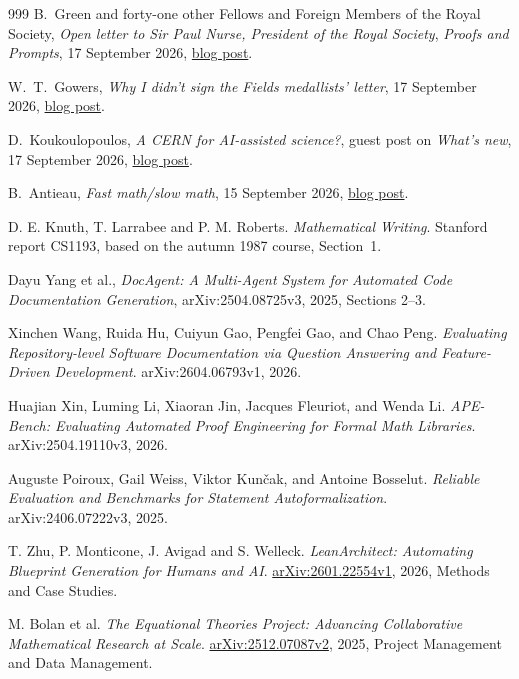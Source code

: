 \documentclass[10pt]{article}
\begin{document}
\begin{thebibliography}{999}
 B.~Green and forty-one other Fellows and Foreign Members
of the Royal Society,
\emph{Open letter to Sir Paul Nurse, President of the Royal Society},
\emph{Proofs and Prompts}, 17 September 2026,
\href{https://proofsandprompts.com/2026/09/17/open-letter-to-sir-paul-nurse-president-of-the-royal-society/}{blog post}.

 W.~T.~Gowers, \emph{Why I didn't sign the Fields medallists'
letter}, 17 September 2026,
\href{https://gowers.wordpress.com/2026/09/17/why-i-didnt-sign-the-fields-medallists-letter/}{blog post}.

 D.~Koukoulopoulos, \emph{A CERN for AI-assisted
science?}, guest post on \emph{What's new}, 17 September 2026,
\href{https://terrytao.wordpress.com/2026/09/17/a-cern-for-ai-assisted-science/}{blog post}.

 B.~Antieau, \emph{Fast math/slow math}, 15 September 2026,
\href{https://antieau.github.io/2026/09/15/fast-math-slow-math.html}{blog post}.

 D. E. Knuth, T. Larrabee and P. M. Roberts. \emph{Mathematical Writing}. Stanford report CS1193, based on the autumn 1987 course, Section~1.

Dayu Yang et al., \emph{DocAgent: A Multi-Agent System for Automated Code Documentation Generation}, arXiv:2504.08725v3, 2025, Sections 2--3.

Xinchen Wang, Ruida Hu, Cuiyun Gao, Pengfei Gao, and Chao Peng. \emph{Evaluating Repository-level Software Documentation via Question Answering and Feature-Driven Development}. arXiv:2604.06793v1, 2026.

Huajian Xin, Luming Li, Xiaoran Jin, Jacques Fleuriot, and Wenda Li. \emph{APE-Bench: Evaluating Automated Proof Engineering for Formal Math Libraries}. arXiv:2504.19110v3, 2026.

Auguste Poiroux, Gail Weiss, Viktor Kun\v{c}ak, and Antoine Bosselut. \emph{Reliable Evaluation and Benchmarks for Statement Autoformalization}. arXiv:2406.07222v3, 2025.

 T. Zhu, P. Monticone, J. Avigad and S. Welleck.
\emph{LeanArchitect: Automating Blueprint Generation for Humans and AI}.
\href{https://arxiv.org/abs/2601.22554v1}{arXiv:2601.22554v1}, 2026, Methods and Case Studies.

 M. Bolan et al. \emph{The Equational Theories Project: Advancing Collaborative Mathematical Research at Scale}.
\href{https://arxiv.org/abs/2512.07087v2}{arXiv:2512.07087v2}, 2025, Project Management and Data Management.


\end{thebibliography}
\end{document}
